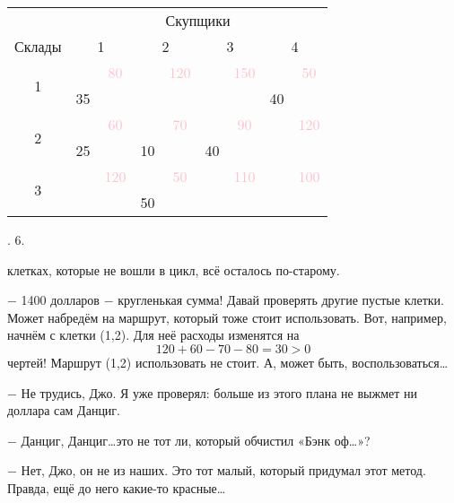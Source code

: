 \newpage
\setcounter{page}{16}
\begin{minipage}[ht]{0.48\linewidth}
\begin{tabular}{|c|cc|cc|cc|cc|}
 \hline
 \rowcolor{cyan} \multirow{2}{*}{} & \multicolumn{8}{|c|}{Скупщики}\\
 \cline{2-9}\cline{2-9} \rowcolor{cyan}Склады&\multicolumn{2}{|c|}{1} & \multicolumn{2}{|c|}{2} & \multicolumn{2}{|c|}{3} & \multicolumn{2}{|c|}{4}\\
 \hline
 \multirow{2}{*}{1} & &\textcolor{pink}{80} & & \textcolor{pink}{120} & & \textcolor{pink}{150} & & \textcolor{pink}{50} \\
 & 35 & & & & & & 40 & \\
 \hline
 \multirow{2}{*}{2}& & \textcolor{pink}{60} & & \textcolor{pink}{70} & & \textcolor{pink}{90} & & \textcolor{pink}{120} \\
 & 25 & & 10 & & 40 & & & \\
 \hline
 \multirow{2}{*}{3}& & \textcolor{pink}{120} & & \textcolor{pink}{50} & & \textcolor{pink}{110} & & \textcolor{pink}{100} \\
 & & & 50 & & & & & \\
 \hline
\end{tabular}


\medskip
{}. 6.

\bigskip

 клетках, которые не вошли в цикл, всё осталось по-старому.

\setlength{\parindent}{3ex}$-$ 1400 долларов $-$ кругленькая сумма! Давай проверять другие пустые клетки. Может набредём на маршрут, который тоже стоит использовать. Вот, например, начнём с клетки (1,2). Для неё расходы изменятся на
\begin{equation*}
    120+60-70-80=30>0
\end{equation*}
 чертей! Маршрут (1,2) использовать не стоит. А, может быть, воспользоваться\ldots

$-$ Не трудись, Джо. Я уже проверял: больше из этого плана не выжмет ни доллара сам Данциг.

$-$ Данциг, Данциг\ldots это не тот ли, который обчистил «Бэнк оф\ldots»?

$-$ Нет, Джо, он не из наших. Это тот малый, который придумал этот метод. Правда, ещё до него какие-то красные\ldots
\end{minipage}\quad

